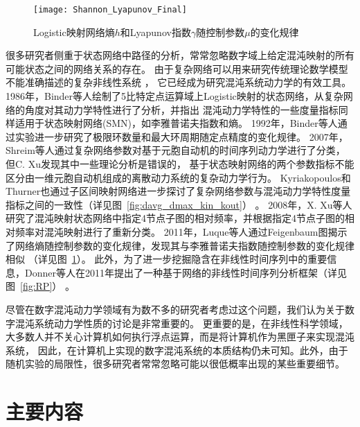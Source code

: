 \begin{figure}[!htb]
\centering
\texttt{[image: Shannon\_Lyapunov\_Final]}
\caption{Logistic映射网络熵$h$和Lyapunov指数$\gamma$随控制参数$\mu$的变化规律}
\label{fig:Shannon_Lyapunov}
\end{figure}

很多研究者侧重于状态网络中路径的分析，常常忽略数字域上给定混沌映射的所有可能状态之间的网络关系的存在。
由于复杂网络可以用来研究传统理论数学模型不能准确描述的复杂非线性系统
，
它已经成为研究混沌系统动力学的有效工具。
1986年，Binder等人绘制了5比特定点运算域上Logistic映射的状态网络，从复杂网络的角度对其动力学特性进行了分析，并指出
混沌动力学特性的一些度量指标同样适用于状态映射网络(SMN)，如李雅普诺夫指数和熵。
1992年，Binder等人通过实验进一步研究了极限环数量和最大环周期随定点精度的变化规律。
2007年，Shreim等人通过复杂网络参数对基于元胞自动机的时间序列动力学进行了分类，但C. Xu发现其中一些理论分析是错误的，
基于状态映射网络的两个参数指标不能区分由一维元胞自动机组成的离散动力系统的复杂动力学行为。
Kyriakopoulos和Thurner也通过子区间映射网络进一步探讨了复杂网络参数与混沌动力学特性度量指标之间的一致性（详见图~\ref{fig:davg_dmax_kin_kout}）
。
2008年，X. Xu等人研究了混沌映射状态网络中指定4节点子图的相对频率，并根据指定4节点子图的相对频率对混沌映射进行了重新分类。
2011年，Luque等人通过Feigenbaum图揭示了网络熵随控制参数的变化规律，发现其与李雅普诺夫指数随控制参数的变化规律相似
（详见图~\ref{fig:Shannon_Lyapunov}）。
此外，为了进一步挖掘隐含在非线性时间序列中的重要信息，Donner等人在2011年提出了一种基于网络的非线性时间序列分析框架（详见图~\ref{fig:RP}）
。

尽管在数字混沌动力学领域有为数不多的研究者考虑过这个问题，我们认为关于数字混沌系统动力学性质的讨论是非常重要的。
更重要的是，在非线性科学领域，大多数人并不关心计算机如何执行浮点运算，而是将计算机作为黑匣子来实现混沌系统，
因此，在计算机上实现的数字混沌系统的本质结构仍未可知。此外，由于随机实验的局限性，很多研究者常常忽略可能以很低概率出现的某些重要细节。

\section{主要内容}

